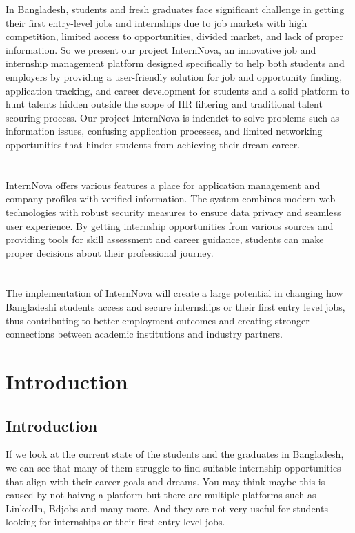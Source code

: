 \documentclass[a4paper, 14pt, openany]{extreport}
\begin{document}
	In Bangladesh, students and fresh graduates face significant challenge in getting their first entry-level jobs and internships due to job markets with high competition, limited access to opportunities, divided market, and lack of proper information. So we present our project InternNova, an innovative job and internship management platform designed specifically to help both students and employers by providing a user-friendly solution for job and opportunity finding, application tracking, and career development for students and a solid platform to hunt talents hidden outside the scope of HR filtering and traditional talent scouring process. Our project InternNova is indendet to solve problems such as information issues, confusing application processes, and limited networking opportunities that hinder students from achieving their dream career.
	\\
	\\
	\\
	InternNova offers various features a place for application management and company profiles with verified information. The system combines modern web technologies with robust security measures to ensure data privacy and seamless user experience. By getting internship opportunities from various sources and providing tools for skill assessment and career guidance, students can make proper decisions about their professional journey.
	\\
	\\
	\\
	The implementation of InternNova will create a large potential in changing how Bangladeshi students access and secure internships or their first entry level jobs, thus contributing to better employment outcomes and creating stronger connections between academic institutions and industry partners. 
	
	\chapter{Introduction}
	\section{Introduction}
	If we look at the current state of the students and the graduates in Bangladesh, we can see that many of them struggle to find suitable internship opportunities that align with their career goals and dreams. You may think maybe this is caused by not haivng a platform but there are multiple platforms such as LinkedIn\cite{linkedin}, Bdjobs\cite{bdjobs} and many more. And they are not very useful for students looking for internships or their first entry level jobs.
	
\end{document}
